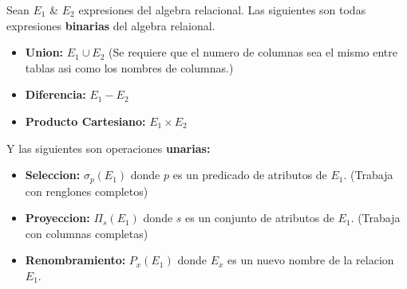 \documentclass[twoside]{article}
\begin{document}
Sean $E_1$ \& $E_2$ expresiones del algebra relacional. Las siguientes son todas expresiones \textbf{binarias} del algebra relaional.\\

\begin{itemize}
  \item \textbf{Union:} $E_1 \cup E_2$ (Se requiere que el numero de columnas sea el mismo entre tablas asi como los nombres de columnas.)
  \item \textbf{Diferencia:} $E_1 - E_2$
  \item \textbf{Producto Cartesiano:} $E_1 \times E_2$
\end{itemize}

Y las siguientes son operaciones \textbf{unarias:}\\

\begin{itemize}
  \item \textbf{Seleccion:} $\sigma_p(E_1)$ donde $p$ es un predicado de atributos de $E_1$. (Trabaja con renglones completos)\\
  \item \textbf{Proyeccion:} $\Pi_s(E_1)$ donde $s$ es un conjunto de atributos de $E_1$. (Trabaja con columnas completas)\\
  \item \textbf{Renombramiento:} $P_x(E_1)$ donde $E_x$ es un nuevo nombre de la relacion $E_1$.
\end{itemize}

\newpage
\end{document}
